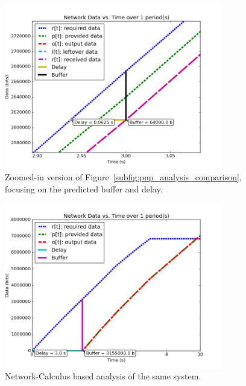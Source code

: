 \begin{figure}[ht!]
  \centering
  \includegraphics[width=0.85\textwidth]{../doc/src/images/results/maren_namek_data_zoom.png}
  \caption{Zoomed-in version of
    Figure~\ref{subfig:pnp_analysis_comparison}, focusing on the
    predicted buffer and delay.}
  \label{fig:zoom_pnp}
\end{figure}

\begin{figure}[ht!]
  \centering
  \includegraphics[width=0.85\textwidth]{../doc/src/images/results/nc_namek_data.png}
  \caption{Network-Calculus based analysis of the same system.}
  \label{fig:nc_comparison}
\end{figure}

